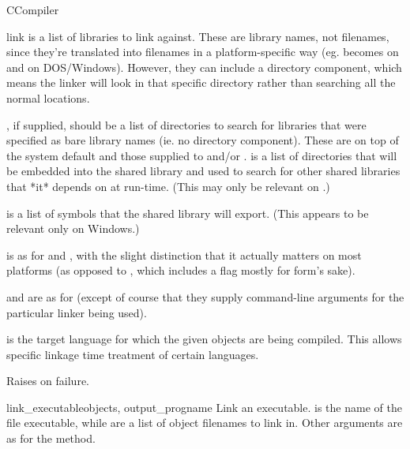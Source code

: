 \documentclass{manual}
\begin{document}
\begin{classdesc}{CCompiler}{}
\begin{methoddesc}{link}
 is a list of libraries to link against.  These are
library names, not filenames, since they're translated into
filenames in a platform-specific way (eg.  becomes 
on \UNIX{} and  on DOS/Windows).  However, they can include a
directory component, which means the linker will look in that
specific directory rather than searching all the normal locations.

, if supplied, should be a list of directories to
search for libraries that were specified as bare library names
(ie. no directory component).  These are on top of the system
default and those supplied to  and/or
.   is a list of
directories that will be embedded into the shared library and used
to search for other shared libraries that *it* depends on at
run-time.  (This may only be relevant on \UNIX.)

 is a list of symbols that the shared library will
export.  (This appears to be relevant only on Windows.)

 is as for  and , 
with the slight distinction that it actually matters on most platforms (as
opposed to , which includes a  flag
mostly for form's sake).

 and  are as for  
(except of course that they supply command-line arguments for the
particular linker being used).

 is the target language for which the given objects
are being compiled. This allows specific linkage time treatment of
certain languages.

Raises  on failure.
\end{methoddesc}

\begin{methoddesc}{link_executable}{objects, output_progname}
Link an executable. 
 is the name of the file executable,
while  are a list of object filenames to link in. Other arguments 
are as for the  method. 
\end{methoddesc}


\end{classdesc}
\end{document}
